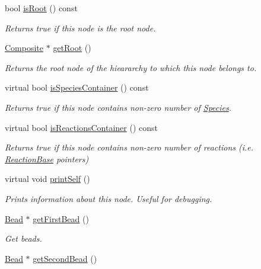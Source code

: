 \begin{DoxyCompactItemize}
bool \hyperlink{classComponent_a4f0bed8144509d6565a30b548fac0fe7}{is\+Root} () const 
\begin{DoxyCompactList}\small\item\em Returns true if this node is the root node. \end{DoxyCompactList}\item 
\hyperlink{classComposite}{Composite} $\ast$ \hyperlink{classComponent_abcb3746cb8b4afcecf437dce40c0c772}{get\+Root} ()
\begin{DoxyCompactList}\small\item\em Returns the root node of the hieararchy to which this node belongs to. \end{DoxyCompactList}\item 
virtual bool \hyperlink{classComponent_a0daf865ff32aff9e68316c65b681cbf9}{is\+Species\+Container} () const 
\begin{DoxyCompactList}\small\item\em Returns true if this node contains non-\/zero number of \hyperlink{classSpecies}{Species}. \end{DoxyCompactList}\item 
virtual bool \hyperlink{classComponent_a506e080028078ef9a753d854c60904a3}{is\+Reactions\+Container} () const 
\begin{DoxyCompactList}\small\item\em Returns true if this node contains non-\/zero number of reactions (i.\+e. \hyperlink{classReactionBase}{Reaction\+Base} pointers) \end{DoxyCompactList}\item 
virtual void \hyperlink{classComponent_a871fbdc783ea600ed667dd37eb8adf1e}{print\+Self} ()
\begin{DoxyCompactList}\small\item\em Prints information about this node. Useful for debugging. \end{DoxyCompactList}\end{DoxyCompactItemize}
{\bf }\par
\begin{DoxyCompactItemize}
\item 
\hyperlink{classBead}{Bead} $\ast$ \hyperlink{classCylinder_a07c1366559d10681ebc873f305c28f3f}{get\+First\+Bead} ()
\begin{DoxyCompactList}\small\item\em Get beads. \end{DoxyCompactList}\item 
\hyperlink{classBead}{Bead} $\ast$ \hyperlink{classCylinder_a954ee598c495e6b86c33b684d2c16435}{get\+Second\+Bead} ()
\end{DoxyCompactItemize}

